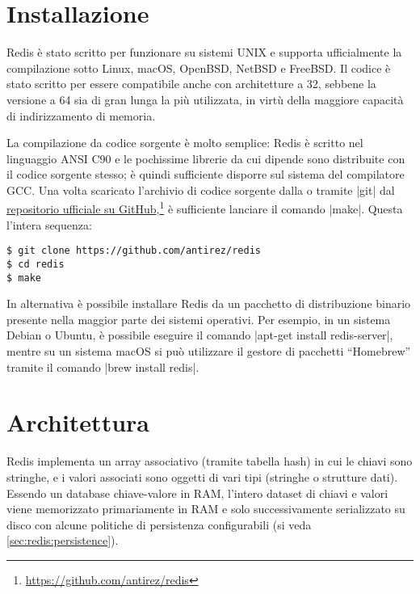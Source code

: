 \section{Installazione}

Redis è stato scritto per funzionare su sistemi UNIX e supporta ufficialmente la
compilazione sotto Linux, macOS, OpenBSD, NetBSD e FreeBSD. Il codice è stato scritto
per essere compatibile anche con architetture a \SI{32}{\bit}, sebbene la versione a 
\SI{64}{\bit} sia di gran lunga la più utilizzata, in virtù della maggiore capacità di 
indirizzamento di memoria.

La compilazione da codice sorgente è molto semplice: Redis è scritto nel linguaggio ANSI C90 e le
pochissime librerie da cui dipende sono distribuite con il codice sorgente stesso; è quindi
sufficiente disporre sul sistema del compilatore GCC. Una volta scaricato l'archivio di codice
sorgente dalla  o tramite
\cverb|git| dal \href{https://github.com/antirez/redis}{repositorio ufficiale su GitHub},\footnote{\url{https://github.com/antirez/redis}}
è sufficiente lanciare il comando \cverb|make|. Questa l'intera sequenza:

\medskip
\begin{lstlisting}
$ git clone https://github.com/antirez/redis
$ cd redis
$ make
\end{lstlisting}

In alternativa è possibile installare Redis da un pacchetto di distribuzione binario
presente nella maggior parte dei sistemi operativi. Per esempio, in un sistema Debian
o Ubuntu, è possibile eseguire il comando \cverb|apt-get install redis-server|, mentre
su un sistema macOS si può utilizzare il gestore di pacchetti ``Homebrew'' tramite il
comando \cverb|brew install redis|.

\section{Architettura}
\label{sec:redis:arch}

Redis implementa un array associativo (tramite tabella hash) in cui le chiavi sono stringhe, e i
valori associati sono oggetti di vari tipi (stringhe o strutture dati). Essendo un database
chiave-valore in RAM, l'intero dataset di chiavi e valori viene memorizzato primariamente in RAM e
solo successivamente serializzato su disco con alcune politiche di persistenza configurabili (si
veda \autoref{sec:redis:persistence}).

